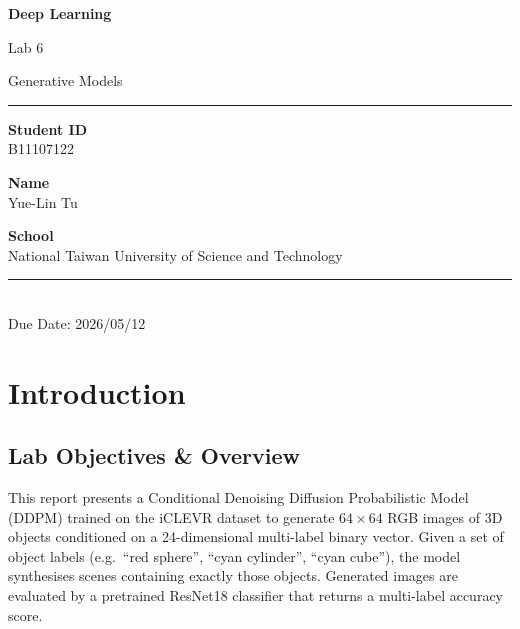 \documentclass[12pt, a4paper]{report}
\title{}
\date{}
\begin{document}
\begin{titlepage}
\centering
\vspace*{3cm}
{\LARGE\bfseries Deep Learning\par}
\vspace{0.5em}
{\Large Lab 6\par}
\vspace{0.5em}
{\large Generative Models\par}

\vspace{1cm}
\rule{0.6\linewidth}{0.8pt}

\vspace{2cm}
{\large\textbf{Student ID}\\[0.3em] B11107122\par}

\vspace{1em}
{\large\textbf{Name}\\[0.3em] Yue-Lin Tu\par}

\vspace{1em}
{\large\textbf{School}\\[0.3em] National Taiwan University of Science and Technology\par}

\vfill
\rule{0.6\linewidth}{0.8pt}\\[0.5em]
{\small Due Date: 2026/05/12}
\end{titlepage}

\tableofcontents
\clearpage

\chapter{Introduction}

\section*{Lab Objectives \& Overview}

This report presents a Conditional Denoising Diffusion Probabilistic Model (DDPM)
trained on the iCLEVR dataset to generate $64\times64$ RGB images of 3D objects
conditioned on a 24-dimensional multi-label binary vector.
Given a set of object labels (e.g.\ ``red sphere'', ``cyan cylinder'', ``cyan cube''),
the model synthesises scenes containing exactly those objects.
Generated images are evaluated by a pretrained ResNet18 classifier that returns a
multi-label accuracy score.
\end{document}
